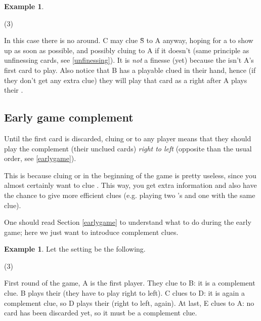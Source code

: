 \documentclass[a4paper]{article}
\theoremstyle{plain}
\theoremstyle{definition}
\newtheorem{example}[theorem]{Example}
\begin{document}
\begin{example}
	\hfill
	\begin{tasks}(3)
		\task[+]      
		\task[A]    
		\task[B]    
		\task[C]    
		\task[D]    
		\task[E]    
	\end{tasks}
	
	In this case there is no  around. C may clue \G{S} to A anyway, hoping for a  to show up as soon as possible, and possibly cluing  to A if it doesn't (same principle as unfinessing cards, see \ref{unfinessing}). It is \textit{not} a finesse (yet) because the  isn't A's first card to play. Also notice that B has a playable clued  in their hand, hence (if they don't get any extra clue) they will play that card as a  right after A plays their .
\end{example}

\subsection{Early game complement}
\label{firstroundcomplement}

Until the first card is discarded, cluing  or  to any player means that they should play the complement (their unclued cards) \textit{right to left} (opposite than the usual order, see \ref{earlygame}).

This is because cluing  or  in the beginning of the game is pretty useless, since you almost certainly want to clue . This way, you get extra information and also have the chance to give more efficient clues (e.g. playing two 's and one  with the same clue).

One should read Section \ref{earlygame} to understand what to do during the early game; here we just want to introduce complement clues.

\begin{example}
	
	Let the setting be the following.
	
	\begin{tasks}(3)
		\task[+]      
		\task[A]    
		\task[B]    
		\task[C]    
		\task[D]    
		\task[E]    
	\end{tasks}
	
	First round of the game, A is the first player. They clue  to B: it is a complement clue. B plays their  (they have to play right to left). C clues  to D: it is again a complement clue, so D plays their  (right to left, again). At last, E clues  to A: no card has been discarded yet, so it must be a complement clue.
\end{example}
\end{document}
